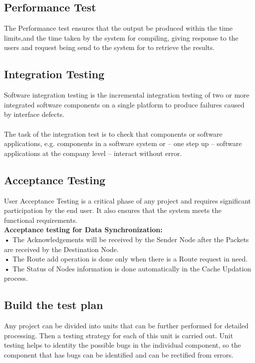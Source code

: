 \documentclass[BTech]{srmuthesis}
\begin{document}
\subsection{Performance Test}
The Performance test ensures that the output be produced within the time limits,and the time taken by the system for compiling, giving response to the users and request being send to the system for to retrieve the results.
\subsection{Integration Testing}
Software integration testing is the incremental integration testing of two or more integrated software components on a single platform to produce failures caused by interface defects.\\\\
The task of the integration test is to check that components or software applications, e.g. components in a software system or – one step up – software applications at the company level – interact without error.
\subsection{Acceptance Testing}
User Acceptance Testing is a critical phase of any project and requires significant participation by the end user. It also ensures that the system meets the functional requirements.\\
\textbf{Acceptance testing for Data Synchronization:}\\
\textbf{•} The Acknowledgements will be received by the Sender Node after the Packets are received by the Destination Node.\\
\textbf{•} The Route add operation is done only when there is a Route request in need.\\
\textbf{•} The Status of Nodes information is done automatically in the Cache Updation process.
\subsection{Build the test plan}
Any project can be divided into units that can be further performed for detailed  processing. Then a testing strategy for each of this unit is carried out. Unit testing helps to identity the possible bugs in the individual component, so the component that has bugs can be identified and can be rectified from errors.
\end{document}
